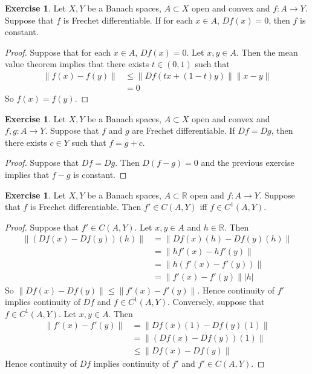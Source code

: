 \documentclass[12pt]{amsart}
\theoremstyle{definition}
\newtheorem{ex}[definition]{Exercise}
\newcommand{\R}{\mathbb{R}}
\begin{document}
	\begin{ex}
	Let $X, Y$ be a Banach spaces, $A \subset X$ open and convex and $f:A \rightarrow Y$. Suppose that $f$ is Frechet differentiable. If for each $x \in A$, $Df(x) = 0$, then $f$ is constant.
	\end{ex}
	
	\begin{proof}
	Suppose that for each $x \in A$, $Df(x) = 0$. Let $x,y \in A$. Then the mean value theorem implies that there exists $t \in (0, 1)$ such that 
	\begin{align*}
	\|f(x) - f(y)\| 
	&\leq \|Df(tx + (1-t)y)\| \|x-y\| \\
	&= 0
	\end{align*}
	So $f(x) = f(y)$. 
	\end{proof}
	
	\begin{ex}
	Let $X, Y$ be a Banach spaces, $A \subset X$ open and convex and $f,g:A \rightarrow Y$. Suppose that $f$ and $g$ are Frechet differentiable. If $Df = Dg$, then there exists $c \in Y$ such that $f = g+c$.
	\end{ex}
	
	\begin{proof}
		Suppose that $Df = Dg$. Then $D(f-g) = 0$ and the previous exercise implies that $f -g$ is constant.
	\end{proof}		
	
	\begin{ex}
	Let $X, Y$ be a Banach spaces, $A \subset \R$ open and $f:A \rightarrow Y$. Suppose that $f$ is Frechet differentiable. Then $f' \in C(A,Y)$ iff $f \in C^1(A,Y)$.
	\end{ex}
	
	\begin{proof}
	Suppose that $f' \in C(A, Y)$. Let $x,y \in A$ and $h \in \R$. Then 
	\begin{align*}
	\|(Df(x)- Df(y))(h)\| 
	&= \|Df(x)(h) - Df(y)(h)\| \\
	&=  \|hf'(x) - hf'(y)\| \\
	&= \|h(f'(x) - f'(y))\| \\
	&= \|f'(x) - f'(y)\||h|
	\end{align*}
	So $\|Df(x) - Df(y)\| \leq \|f'(x) - f'(y)\|$. Hence continuity of $f'$ implies continuity of $Df$ and $f \in C^1(A, Y)$.
	Conversely, suppose that $f \in C^1(A, Y)$. Let $x,y \in A$. Then 
	\begin{align*}
	\|f'(x) - f'(y)\| 
	&= \|Df(x)(1) - Df(y)(1)\| \\
	&= \|(Df(x) - Df(y))(1)\| \\
	& \leq \| Df(x) - Df(y)\|
	\end{align*}
	Hence continuity of $Df$ implies continuity of $f'$ and $f' \in C(A, Y)$.
	\end{proof}
	
\end{document}
